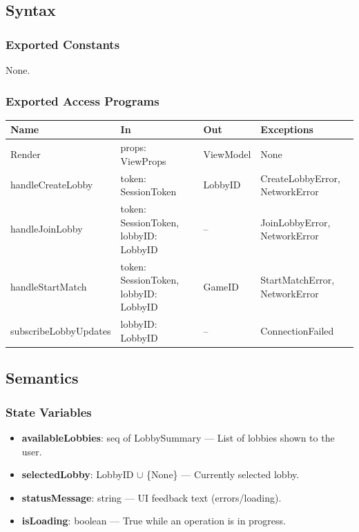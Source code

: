 \documentclass[12pt, titlepage]{article}
\begin{document}
\subsection{Syntax}

\subsubsection{Exported Constants}
None.

\subsubsection{Exported Access Programs}

\begin{center}
    \begin{tabular}{p{4.5cm} p{5cm} p{3.5cm} p{3.5cm}}
        \toprule
        \textbf{Name} & \textbf{In} & \textbf{Out} & \textbf{Exceptions} \\
        \midrule
        Render & props: ViewProps & ViewModel & None \\
        handleCreateLobby & token: SessionToken & LobbyID & CreateLobbyError, NetworkError \\
        handleJoinLobby & token: SessionToken, lobbyID: LobbyID & -- & JoinLobbyError, NetworkError \\
        handleStartMatch & token: SessionToken, lobbyID: LobbyID & GameID & StartMatchError, NetworkError \\
        subscribeLobbyUpdates & lobbyID: LobbyID & -- & ConnectionFailed \\
        \bottomrule
    \end{tabular}
\end{center}

\subsection{Semantics}

\subsubsection{State Variables}
\begin{itemize}
    \item \textbf{availableLobbies}: seq of LobbySummary --- List of lobbies shown to the user.
    \item \textbf{selectedLobby}: LobbyID $\cup$ \{None\} --- Currently selected lobby.
    \item \textbf{statusMessage}: string --- UI feedback text (errors/loading).
    \item \textbf{isLoading}: boolean --- True while an operation is in progress.
\end{itemize}
\end{document}
